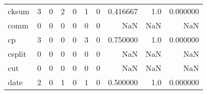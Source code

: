 \begin{longtable}{lrrrrrrrrr}
cksum     &                                       3 &                                                  0 &                                                  2 &                                                  0 &                                                  1 &                                                  0 &                                           0.416667 &                                    1.0 &                             0.000000 \\
comm      &                                       0 &                                                  0 &                                                  0 &                                                  0 &                                                  0 &                                                  0 &                                                NaN &                                    NaN &                                  NaN \\
cp        &                                       3 &                                                  0 &                                                  0 &                                                  0 &                                                  3 &                                                  0 &                                           0.750000 &                                    1.0 &                             0.000000 \\
csplit    &                                       0 &                                                  0 &                                                  0 &                                                  0 &                                                  0 &                                                  0 &                                                NaN &                                    NaN &                                  NaN \\
cut       &                                       0 &                                                  0 &                                                  0 &                                                  0 &                                                  0 &                                                  0 &                                                NaN &                                    NaN &                                  NaN \\
date      &                                       2 &                                                  0 &                                                  1 &                                                  0 &                                                  1 &                                                  0 &                                           0.500000 &                                    1.0 &                             0.000000 \\

\end{longtable}
